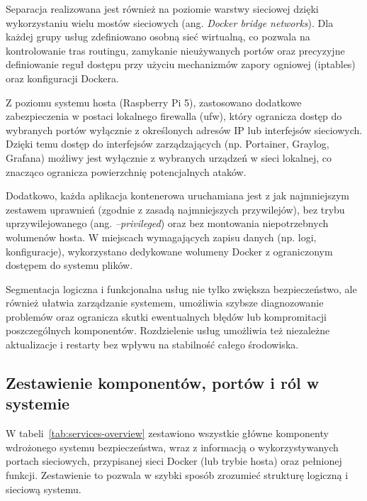 \documentclass[
    left=2.5cm,         %
    right=2.5cm,        %
    top=2.5cm,          %
    bottom=3cm,         %
    bindingoffset=6mm,  %
    nohyphenation=true %
]{eiti/eiti-thesis} %
\begin{document}
Separacja realizowana jest również na poziomie warstwy sieciowej dzięki wykorzystaniu wielu mostów sieciowych (ang. \textit{Docker bridge networks}). Dla każdej grupy usług zdefiniowano osobną sieć wirtualną, co pozwala na kontrolowanie tras routingu, zamykanie nieużywanych portów oraz precyzyjne definiowanie reguł dostępu przy użyciu mechanizmów zapory ogniowej (iptables) oraz konfiguracji Dockera.

Z poziomu systemu hosta (Raspberry Pi 5), zastosowano dodatkowe zabezpieczenia w postaci lokalnego firewalla (ufw), który ogranicza dostęp do wybranych portów wyłącznie z określonych adresów IP lub interfejsów sieciowych. Dzięki temu dostęp do interfejsów zarządzających (np. Portainer, Graylog, Grafana) możliwy jest wyłącznie z wybranych urządzeń w sieci lokalnej, co znacząco ogranicza powierzchnię potencjalnych ataków.

Dodatkowo, każda aplikacja kontenerowa uruchamiana jest z jak najmniejszym zestawem uprawnień (zgodnie z zasadą najmniejszych przywilejów), bez trybu uprzywilejowanego (ang. \textit{--privileged}) oraz bez montowania niepotrzebnych wolumenów hosta. W miejscach wymagających zapisu danych (np. logi, konfiguracje), wykorzystano dedykowane wolumeny Docker z ograniczonym dostępem do systemu plików.

Segmentacja logiczna i funkcjonalna usług nie tylko zwiększa bezpieczeństwo, ale również ułatwia zarządzanie systemem, umożliwia szybsze diagnozowanie problemów oraz ogranicza skutki ewentualnych błędów lub kompromitacji poszczególnych komponentów. Rozdzielenie usług umożliwia też niezależne aktualizacje i restarty bez wpływu na stabilność całego środowiska.

\subsection{Zestawienie komponentów, portów i ról w systemie}

W tabeli~\ref{tab:services-overview} zestawiono wszystkie główne komponenty wdrożonego systemu bezpieczeństwa, wraz z informacją o wykorzystywanych portach sieciowych, przypisanej sieci Docker (lub trybie hosta) oraz pełnionej funkcji. Zestawienie to pozwala w szybki sposób zrozumieć strukturę logiczną i sieciową systemu.
\end{document}
